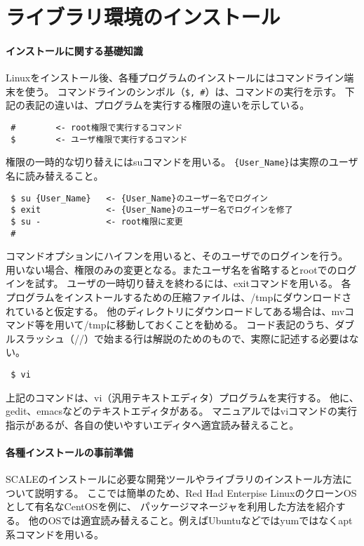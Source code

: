 \chapter{ライブラリ環境のインストール}
\label{sec:env_setting}

\subsubsection{インストールに関する基礎知識}

Linuxをインストール後、各種プログラムのインストールにはコマンドライン端末を使う。
コマンドラインのシンボル（\verb|$, #|）は、コマンドの実行を示す。
下記の表記の違いは、プログラムを実行する権限の違いを示している。

\begin{verbatim}
 #        <- root権限で実行するコマンド
 $        <- ユーザ権限で実行するコマンド
\end{verbatim}
権限の一時的な切り替えにはsuコマンドを用いる。
\verb|{User_Name}|は実際のユーザ名に読み替えること。
\begin{verbatim}
 $ su {User_Name}   <- {User_Name}のユーザー名でログイン
 $ exit             <- {User_Name}のユーザー名でログインを修了
 $ su -             <- root権限に変更
 #
\end{verbatim}

コマンドオプションにハイフンを用いると、そのユーザでのログインを行う。
用いない場合、権限のみの変更となる。またユーザ名を省略するとrootでのログインを試す。
ユーザの一時切り替えを終わるには、exitコマンドを用いる。
各プログラムをインストールするための圧縮ファイルは、/tmpにダウンロードされていると仮定する。
他のディレクトリにダウンロードしてある場合は、mvコマンド等を用いて/tmpに移動しておくことを勧める。
コード表記のうち、ダブルスラッシュ（//）で始まる行は解説のためのもので、実際に記述する必要はない。


\begin{verbatim}
 $ vi
\end{verbatim}

上記のコマンドは、vi（汎用テキストエディタ）プログラムを実行する。
他に、gedit、emacsなどのテキストエディタがある。
マニュアルではviコマンドの実行指示があるが、各自の使いやすいエディタへ適宜読み替えること。

\subsubsection{各種インストールの事前準備}

SCALEのインストールに必要な開発ツールやライブラリのインストール方法について説明する。
ここでは簡単のため、Red Had Enterpise LinuxのクローンOSとして有名なCentOSを例に、
パッケージマネージャを利用した方法を紹介する。
他のOSでは適宜読み替えること。例えばUbuntuなどではyumではなくapt系コマンドを用いる。

